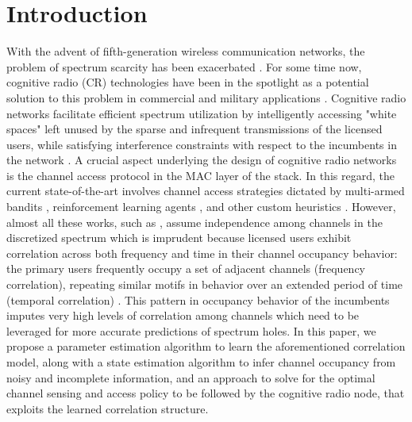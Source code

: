 \documentclass[10pt,twocolumn]{IEEEtran}
\begin{document}
\section{Introduction}\label{I}
With the advent of fifth-generation wireless communication networks, the problem of spectrum scarcity has been exacerbated \cite{7158089}. For some time now, cognitive radio (CR) technologies have been in the spotlight as a potential solution to this problem in commercial and military applications \cite{6882406}. Cognitive radio networks facilitate efficient spectrum utilization by intelligently accessing "white spaces" left unused by the sparse and infrequent transmissions of the licensed users, while satisfying interference constraints with respect to the incumbents in the network \cite{4562537}. A crucial aspect underlying the design of cognitive radio networks is the channel access protocol in the MAC layer of the stack. In this regard, the current state-of-the-art involves channel access strategies dictated by multi-armed bandits \cite{7094730}, reinforcement learning agents \cite{6507570}, and other custom heuristics \cite{6956794, 4554696, 7032338}. However, almost all these works, such as \cite{7094730, 6507570, 5496076, 4804743}, assume independence among channels in the discretized spectrum which is imprudent because licensed users exhibit correlation across both frequency and time in their channel occupancy behavior: the primary users frequently occupy a set of adjacent channels (frequency correlation), repeating similar motifs in behavior over an extended period of time (temporal correlation) \cite{6188346, 4213046,McHenry:2006:CSO:1234388.1234389}. This pattern in occupancy behavior of the incumbents imputes very high levels of correlation among channels which need to be leveraged for more accurate predictions of spectrum holes. In this paper, we propose a parameter estimation algorithm to learn the aforementioned correlation model, along with a state estimation algorithm to infer channel occupancy from noisy and incomplete information, and an approach to solve for the optimal channel sensing and access policy to be followed by the cognitive radio node, that exploits the learned correlation structure.
\end{document}
